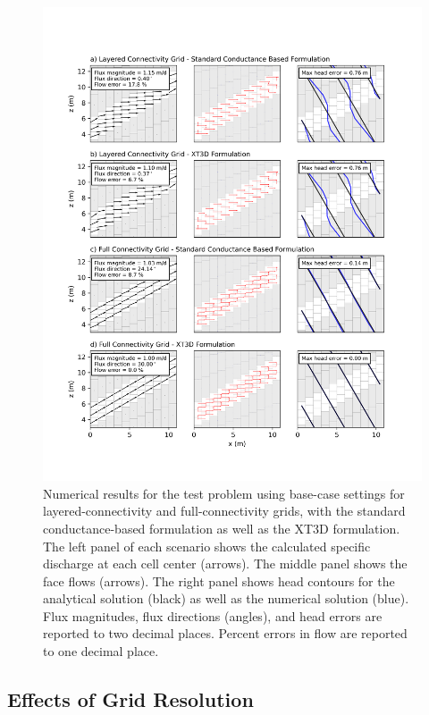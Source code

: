 \documentclass{article}
\begin{document}
\begin{figure}[p!]
	\begin{center}
	\includegraphics[scale=0.75]{../figures/fig2_paper.png}
	\caption{Numerical results for the test problem using base-case settings for layered-connectivity and full-connectivity grids, with the standard conductance-based formulation as well as the XT3D formulation. The left panel of each scenario shows the calculated specific discharge at each cell center (arrows). The middle panel shows the face flows (arrows). The right panel shows head contours for the analytical solution (black) as well as the numerical solution (blue). {\color{red} Flux magnitudes, flux directions (angles), and head errors are reported to two decimal places. Percent errors in flow are reported to one decimal place.}}
	\label{fig:fig2}
	\end{center}
\end{figure}

\subsection*{Effects of Grid Resolution}
\end{document}

